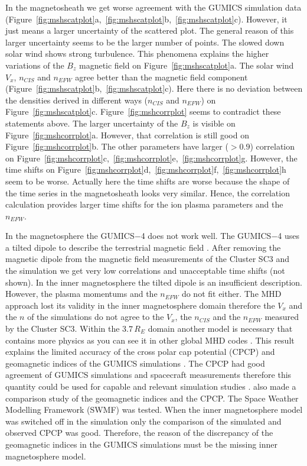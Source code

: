 \documentclass[linenumbers,draft]{agujournal}
\begin{document}
In the magnetosheath we get worse agreement with the GUMICS simulation data (Figure~\ref{fig:mshscatplot}a,~\ref{fig:mshscatplot}b,~\ref{fig:mshscatplot}c). However, it just means a larger uncertainty of the scattered plot. The general reason of this larger uncertainty seems to be the larger number of points. The slowed down solar wind shows strong turbulence. This phenomena explains the higher variations of the $B_{z}$ magnetic field on Figure~\ref{fig:mshscatplot}a. The solar wind $V_{x}$, $n_{CIS}$ and $n_{EFW}$ agree better than the magnetic field component (Figure~\ref{fig:mshscatplot}b,~\ref{fig:mshscatplot}c). Here there is no deviation between the densities derived in different ways ($n_{CIS}$ and $n_{EFW}$) on Figure~\ref{fig:mshscatplot}c. Figure~\ref{fig:mshcorrplot} seems to contradict these statements above. The larger uncertainty of the $B_{z}$ is visible on Figure~\ref{fig:mshcorrplot}a. However, that correlation is still good on Figure~\ref{fig:mshcorrplot}b. The other parameters have larger ($>0.9$) correlation on Figure~\ref{fig:mshcorrplot}c,~\ref{fig:mshcorrplot}e,~\ref{fig:mshcorrplot}g. However, the time shifts on Figure~\ref{fig:mshcorrplot}d,~\ref{fig:mshcorrplot}f,~\ref{fig:mshcorrplot}h seem to be worse. Actually here the time shifts are worse because the shape of the time series in the magnetosheath looks very similar. Hence, the correlation calculation provides larger time shifts for the ion plasma parameters and the $n_{EFW}$. 

In the magnetosphere the GUMICS$-$4 does not work well. The GUMICS$-$4 uses a tilted dipole to describe the terrestrial magnetic field \citep{janhunen12:_gumic_mhd}. After removing the magnetic dipole from the magnetic field measurements of the Cluster SC3 and the simulation we get very low correlations and unacceptable time shifts (not shown). In the inner magnetosphere the tilted dipole is an insufficient description. However, the plasma momentums and the $n_{EFW}$ do not fit either. The MHD approach lost its validity in the inner magnetosphere domain therefore the $V_{x}$ and the $n$ of the simulations do not agree to the $V_{x}$, the $n_{CIS}$ and the $n_{EFW}$ measured by the Cluster SC3. Within the $3.7\,R_{E}$ domain another model is necessary that contains more physics as you can see it in other global MHD codes \citep{lyon04:_lyon_fedder_mobar_lfm_mhd,raeder08:_openg_simul_themis_mission,powell99:_solut_adapt_upwin_schem_ideal_magnet,toth12:_adapt}. This result explains the limited accuracy of the cross polar cap potential (CPCP) and  geomagnetic indices of the GUMICS simulations \citep{juusola14:_statis_gumic_mhd}. The CPCP had good agreement of GUMICS simulations and spacecraft measurements therefore this quantity could be used for capable and relevant simulation studies \citep{lakka18:_cross_polar_cap_satur_gumic}. \citet{haiducek17:_swmf_global_magnet_simul_januar} also made a comparison study of the geomagnetic indices and the CPCP. The Space Weather Modelling Framework (SWMF) was tested. When the inner magnetosphere model was switched off in the simulation only the comparison of the simulated and observed CPCP was good. Therefore, the reason of the discrepancy of the geomagnetic indices in the GUMICS simulations must be the missing inner magnetosphere model.
\end{document}
